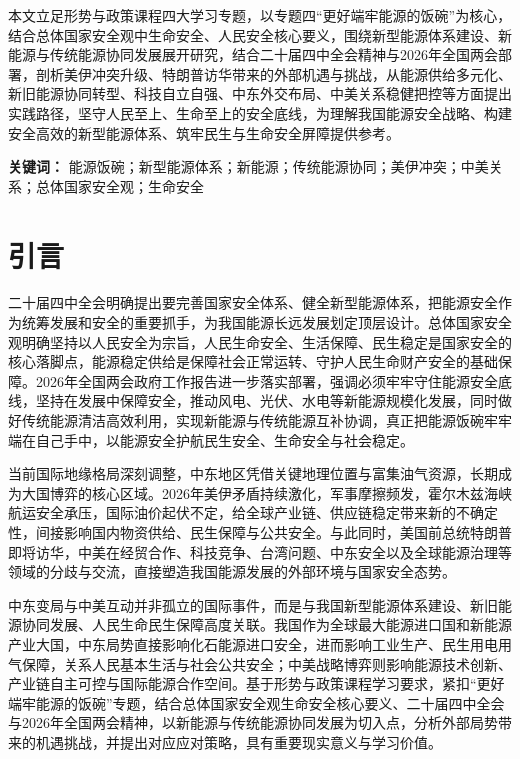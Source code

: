 \documentclass[12pt,a4paper,UTF8]{article}
\begin{document}
本文立足形势与政策课程四大学习专题，以专题四“更好端牢能源的饭碗”为核心，结合总体国家安全观中生命安全、人民安全核心要义，围绕新型能源体系建设、新能源与传统能源协同发展展开研究，结合二十届四中全会精神与2026年全国两会部署，剖析美伊冲突升级、特朗普访华带来的外部机遇与挑战，从能源供给多元化、新旧能源协同转型、科技自立自强、中东外交布局、中美关系稳健把控等方面提出实践路径，坚守人民至上、生命至上的安全底线，为理解我国能源安全战略、构建安全高效的新型能源体系、筑牢民生与生命安全屏障提供参考。

\vspace{0.5cm}
\noindent\textbf{关键词：} 能源饭碗；新型能源体系；新能源；传统能源协同；美伊冲突；中美关系；总体国家安全观；生命安全

\newpage
{}

\section{引言}
二十届四中全会明确提出要完善国家安全体系、健全新型能源体系，把能源安全作为统筹发展和安全的重要抓手，为我国能源长远发展划定顶层设计。总体国家安全观明确坚持以人民安全为宗旨，人民生命安全、生活保障、民生稳定是国家安全的核心落脚点，能源稳定供给是保障社会正常运转、守护人民生命财产安全的基础保障。2026年全国两会政府工作报告进一步落实部署，强调必须牢牢守住能源安全底线，坚持在发展中保障安全，推动风电、光伏、水电等新能源规模化发展，同时做好传统能源清洁高效利用，实现新能源与传统能源互补协调，真正把能源饭碗牢牢端在自己手中，以能源安全护航民生安全、生命安全与社会稳定。

当前国际地缘格局深刻调整，中东地区凭借关键地理位置与富集油气资源，长期成为大国博弈的核心区域。2026年美伊矛盾持续激化，军事摩擦频发，霍尔木兹海峡航运安全承压，国际油价起伏不定，给全球产业链、供应链稳定带来新的不确定性，间接影响国内物资供给、民生保障与公共安全。与此同时，美国前总统特朗普即将访华，中美在经贸合作、科技竞争、台湾问题、中东安全以及全球能源治理等领域的分歧与交流，直接塑造我国能源发展的外部环境与国家安全态势。

中东变局与中美互动并非孤立的国际事件，而是与我国新型能源体系建设、新旧能源协同发展、人民生命民生保障高度关联。我国作为全球最大能源进口国和新能源产业大国，中东局势直接影响化石能源进口安全，进而影响工业生产、民生用电用气保障，关系人民基本生活与社会公共安全；中美战略博弈则影响能源技术创新、产业链自主可控与国际能源合作空间。基于形势与政策课程学习要求，紧扣“更好端牢能源的饭碗”专题，结合总体国家安全观生命安全核心要义、二十届四中全会与2026年全国两会精神，以新能源与传统能源协同发展为切入点，分析外部局势带来的机遇挑战，并提出对应应对策略，具有重要现实意义与学习价值。
\end{document}
